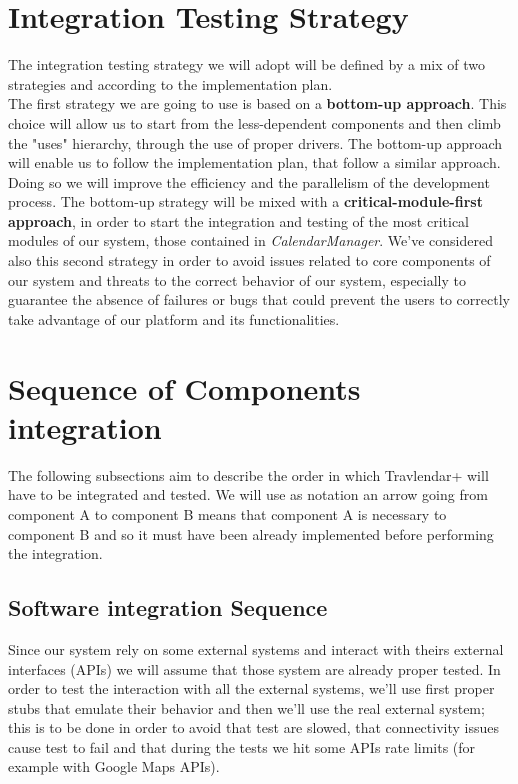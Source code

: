 \section{Integration Testing Strategy}
The integration testing strategy we will adopt will be defined by a mix of two strategies and according to the  implementation plan. \\
The first strategy we are going to use is based on a \textbf{bottom-up approach}. This choice will allow us to start from the less-dependent components and then climb the "uses" hierarchy, through the use of proper drivers. The bottom-up approach will enable us to follow the implementation plan, that follow a similar approach. Doing so we will improve the efficiency and the parallelism of the development process. \newline
The bottom-up strategy will be mixed with a \textbf{critical-module-first approach}, in order to start the integration and testing of the most critical modules of our system, those contained in \textit{CalendarManager}. We've considered also this second strategy in order to avoid issues related to core components of our system and threats to the correct behavior of our system, especially to guarantee the absence of failures or bugs that could prevent the users to correctly take advantage of our platform and its functionalities.

\section{Sequence of Components integration}
The following subsections aim to describe the order in which Travlendar+ will have to be integrated and tested. We will use as notation an arrow going from component A to component B means that component A is necessary to component B and so it must have been already implemented before performing the integration.

\subsection{Software integration Sequence}
Since our system rely on some external systems and interact with theirs external interfaces (APIs) we will assume that those system are already proper tested. In order to test the interaction with all the external systems, we'll use first proper stubs that emulate their behavior and then we'll use the real external system; this is to be done in order to avoid that test are slowed, that connectivity issues cause test to fail and that during the tests we hit some APIs rate limits (for example with Google Maps APIs).

